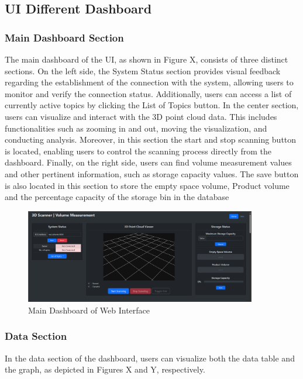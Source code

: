 \subsection{UI Different Dashboard}
\subsubsection*{Main Dashboard Section}
The main dashboard of the UI, as shown in Figure X, consists of three distinct sections. On the left side, the System Status section provides visual feedback regarding the establishment of the connection with the system, allowing users to monitor and verify the connection status. Additionally, users can access a list of currently active topics by clicking the List of Topics button. In the center section, users can visualize and interact with the 3D point cloud data. This includes functionalities such as zooming in and out, moving the visualization, and conducting analysis. Moreover, in this section the start and stop scanning button is located, enabling users to control the scanning process directly from the dashboard. Finally, on the right side, users can find volume measurement values and other pertinent information, such as storage capacity values. The save button is also located in this section to store the empty space volume, Product volume and the percentage capacity of the storage bin in the database

\begin{figure}[H]
	\centering
	\includegraphics[width=0.9\textwidth]{Figures/main-dashboard}
	\caption{Main Dashboard of Web Interface}
	\label{ch4:fig:main-dashboard}
\end{figure}

\subsubsection*{Data Section}

In the data section of the dashboard, users can visualize both the data table and the graph, as depicted in Figures X and Y, respectively.

